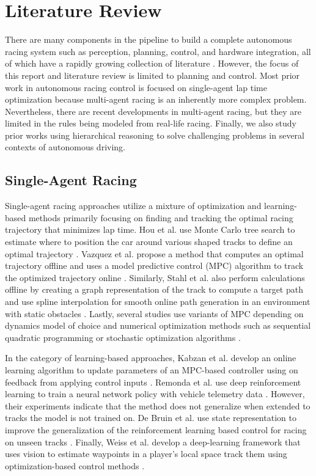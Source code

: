 \chapter{Literature Review} \label{chapter:litreview}
There are many components in the pipeline to build a complete autonomous racing system such as perception, planning, control, and hardware integration, all of which have a rapidly growing collection of literature \cite{litreview}. However, the focus of this report and literature review is limited to planning and control. Most prior work in autonomous racing control is focused on single-agent lap time optimization because multi-agent racing is an inherently more complex problem. Nevertheless, there are recent developments in multi-agent racing, but they are limited in the rules being modeled from real-life racing. Finally, we also study prior works using hierarchical reasoning to solve challenging problems in several contexts of autonomous driving. 

\section{Single-Agent Racing} 
Single-agent racing approaches utilize a mixture of optimization and learning-based methods primarily focusing on finding and tracking the optimal racing trajectory that minimizes lap time. Hou et al. use Monte Carlo tree search to estimate where to position the car around various shaped tracks to define an optimal trajectory \cite{Hou2016}. Vazquez et al. propose a method that computes an optimal trajectory offline and uses a model predictive control (MPC) algorithm to track the optimized trajectory online \cite{Vazquez2020}. Similarly, Stahl et al. also perform calculations offline by creating a graph representation of the track to compute a target path and use spline interpolation for smooth online path generation in an environment with static obstacles \cite{Stahl2019_2}. Lastly, several studies use variants of MPC depending on dynamics model of choice and numerical optimization methods such as sequential quadratic programming or stochastic optimization algorithms \cite{Liniger2014, Anderson2016, Kalaria2021, Kloeser2020,OKelly2020}.  

In the category of learning-based approaches, Kabzan et al. develop an online learning algorithm to update parameters of an MPC-based controller using on feedback from applying control inputs \cite{Kabzan2019}. Remonda et al. use deep reinforcement learning to train a neural network policy with vehicle telemetry data \cite{Remonda2021}. However, their experiments indicate that the method does not generalize when extended to tracks the model is not trained on. De Bruin et al. use state representation to improve the generalization of the reinforcement learning based control for racing on unseen tracks \cite{deBruin2018}. Finally, Weiss et al. develop a deep-learning framework that uses vision to estimate waypoints in a player's local space track them using optimization-based control methods \cite{weiss2020}.

